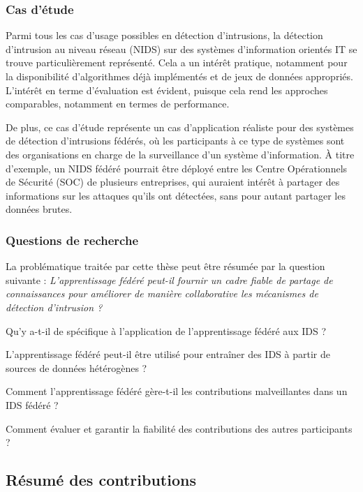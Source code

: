 \subsubsection{Cas d'étude\label{sec:french.usecase}}

Parmi tous les cas d'usage possibles en détection d'intrusions, la détection d'intrusion au niveau réseau (NIDS) sur des systèmes d'information orientés IT se trouve particulièrement représenté.
Cela a un intérêt pratique, notamment pour la disponibilité d'algorithmes déjà implémentés et de jeux de données appropriés.
L'intérêt en terme d'évaluation est évident, puisque cela rend les approches comparables, notamment en termes de performance. 

De plus, ce cas d'étude représente un cas d'application réaliste pour des systèmes de détection d'intrusions fédérés, où les participants à ce type de systèmes sont des organisations en charge de la surveillance d'un système d'information.
À titre d'exemple, un NIDS fédéré pourrait être déployé entre les Centre Opérationnels de Sécurité (SOC) de plusieurs entreprises, qui auraient intérêt à partager des informations sur les attaques qu'ils ont détectées, sans pour autant partager les données brutes.


\subsubsection{Questions de recherche\label{sec:french.questions}}

La problématique traitée par cette thèse peut être résumée par la question suivante : \emph{L'apprentissage fédéré peut-il fournir un cadre fiable de partage de connaissances pour améliorer de manière collaborative les mécanismes de détection d'intrusion ?}

\begin{questions}
  \item Qu'y a-t-il de spécifique à l'application de l'apprentissage fédéré aux IDS ?
  \item L'apprentissage fédéré peut-il être utilisé pour entraîner des IDS à partir de sources de données hétérogènes ?
  \item Comment l'apprentissage fédéré gère-t-il les contributions malveillantes dans un IDS fédéré ?
  \item Comment évaluer et garantir la fiabilité des contributions des autres participants ?
\end{questions}


\subsection{Résumé des contributions\label{sec:french.summary}}

